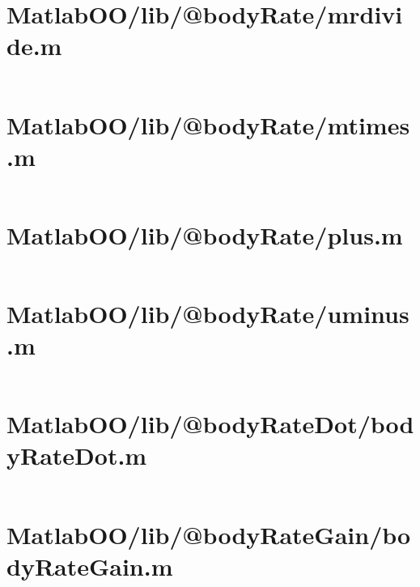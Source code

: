 \pagebreak
\section{MatlabOO/lib/@bodyRate/mrdivide.m}\label{code:MatlabOO/lib/@bodyRate/mrdivide.m}
\inputminted[linenos,fontsize=\scriptsize]{matlab}{/home/dcouture/git/mathyourlife/TSatPy/beta_versions/matlab_object_oriented/lib/@bodyRate/mrdivide.m}

\pagebreak
\section{MatlabOO/lib/@bodyRate/mtimes.m}\label{code:MatlabOO/lib/@bodyRate/mtimes.m}
\inputminted[linenos,fontsize=\scriptsize]{matlab}{/home/dcouture/git/mathyourlife/TSatPy/beta_versions/matlab_object_oriented/lib/@bodyRate/mtimes.m}

\pagebreak
\section{MatlabOO/lib/@bodyRate/plus.m}\label{code:MatlabOO/lib/@bodyRate/plus.m}
\inputminted[linenos,fontsize=\scriptsize]{matlab}{/home/dcouture/git/mathyourlife/TSatPy/beta_versions/matlab_object_oriented/lib/@bodyRate/plus.m}

\pagebreak
\section{MatlabOO/lib/@bodyRate/uminus.m}\label{code:MatlabOO/lib/@bodyRate/uminus.m}
\inputminted[linenos,fontsize=\scriptsize]{matlab}{/home/dcouture/git/mathyourlife/TSatPy/beta_versions/matlab_object_oriented/lib/@bodyRate/uminus.m}

\pagebreak
\section{MatlabOO/lib/@bodyRateDot/bodyRateDot.m}\label{code:MatlabOO/lib/@bodyRateDot/bodyRateDot.m}
\inputminted[linenos,fontsize=\scriptsize]{matlab}{/home/dcouture/git/mathyourlife/TSatPy/beta_versions/matlab_object_oriented/lib/@bodyRateDot/bodyRateDot.m}

\pagebreak
\section{MatlabOO/lib/@bodyRateGain/bodyRateGain.m}\label{code:MatlabOO/lib/@bodyRateGain/bodyRateGain.m}
\inputminted[linenos,fontsize=\scriptsize]{matlab}{/home/dcouture/git/mathyourlife/TSatPy/beta_versions/matlab_object_oriented/lib/@bodyRateGain/bodyRateGain.m}

